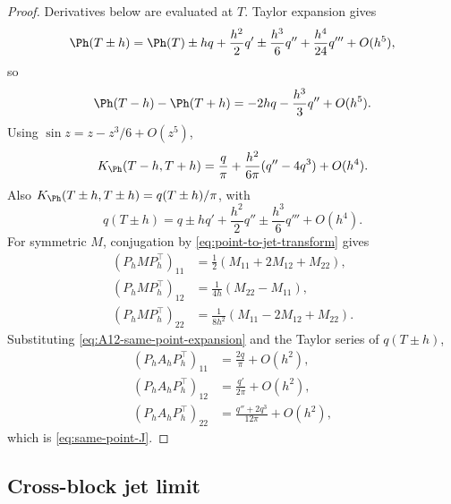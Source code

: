\begin{proof}
Derivatives below are evaluated at \(T\).  Taylor expansion gives
\[
\Ph(T\pm h) = \Ph(T) \pm hq + \frac{h^2}{2}q'
            \pm \frac{h^3}{6}q'' + \frac{h^4}{24}q'''
            + O(h^5),
\]
so
\[
\Ph(T-h)-\Ph(T+h) = -2hq - \frac{h^3}{3}q'' + O(h^5).
\]
Using \(\sin z = z - z^3/6 + O(z^5)\),
\begin{equation}
\label{eq:A12-same-point-expansion}
K_\Ph(T-h, T+h)
= \frac{q}{\pi} + \frac{h^2}{6\pi}(q'' - 4q^3) + O(h^4).
\end{equation}
Also \(K_\Ph(T\pm h,T\pm h)=q(T\pm h)/\pi\), with
\[
q(T\pm h)=q\pm hq'+\frac{h^2}{2}q''
          \pm\frac{h^3}{6}q'''+O(h^4).
\]
For symmetric \(M\), conjugation by \eqref{eq:point-to-jet-transform}
gives
\begin{align*}
(P_h M P_h^\top)_{11} &= \tfrac12(M_{11}+2M_{12}+M_{22}),\\
(P_h M P_h^\top)_{12} &= \tfrac{1}{4h}(M_{22}-M_{11}),\\
(P_h M P_h^\top)_{22} &= \tfrac{1}{8h^2}(M_{11}-2M_{12}+M_{22}).
\end{align*}
Substituting \eqref{eq:A12-same-point-expansion} and the Taylor series
of \(q(T\pm h)\),
\begin{align*}
(P_h A_h P_h^\top)_{11} &= \frac{2q}{\pi} + O(h^2),\\
(P_h A_h P_h^\top)_{12} &= \frac{q'}{2\pi} + O(h^2),\\
(P_h A_h P_h^\top)_{22} &= \frac{q''+2q^3}{12\pi} + O(h^2),
\end{align*}
which is \eqref{eq:same-point-J}.
\end{proof}

\subsection{Cross-block jet limit}
\label{subsec:cross-block-jet-limit}

